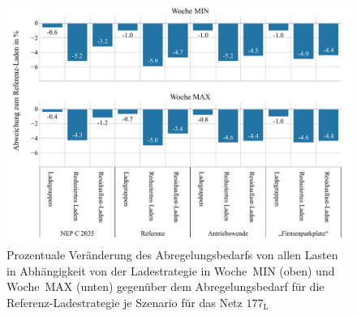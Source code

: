 \begin{figure}[H]
    \centering
    \includegraphics[width=\textwidth]{Bilder/177_cur_load_both_weeks}
    \caption[Prozentuale Veränderung des Abregelungsbedarfs von allen Lasten in Abhängigkeit von der Ladestrategie in Woche~MIN und Woche~MAX gegenüber dem Abregelungsbedarf für die Referenz-Ladestrategie je Szenario für das Netz \num{177}]{Prozentuale Veränderung des Abregelungsbedarfs von allen Lasten in Abhängigkeit von der Ladestrategie in Woche~MIN (oben) und Woche~MAX (unten) gegenüber dem Abregelungsbedarf für die Referenz-Ladestrategie je Szenario für das Netz \(177_{\text{L}}\)}\label{fig:177_cur_load_both_weeks}
\end{figure}